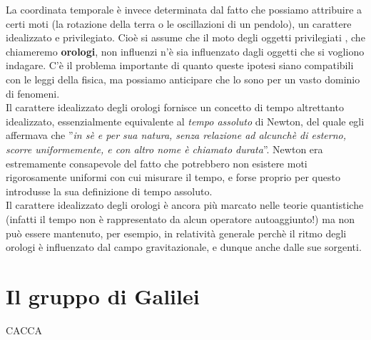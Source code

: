 \documentclass[a4paper,11pt]{book}
\theoremstyle{plain}
\theoremstyle{definition}
\begin{document}
La coordinata temporale è invece determinata dal fatto che possiamo attribuire a certi 
moti (la rotazione della terra o le oscillazioni di un pendolo), un carattere idealizzato e 
privilegiato. Cioè si assume che il moto degli oggetti privilegiati , che chiameremo \textbf{orologi}, 
non influenzi n'è sia influenzato dagli oggetti che si vogliono indagare. C'è il problema 
importante di quanto queste ipotesi siano compatibili con le leggi della fisica, ma possiamo 
anticipare che lo sono per un vasto dominio di fenomeni. \\
Il carattere idealizzato degli orologi fornisce un concetto di tempo altrettanto idealizzato, 
essenzialmente equivalente al \emph{tempo assoluto} di Newton, del quale egli affermava che 
''\emph{in sè e per sua natura, senza relazione ad alcunchè di esterno, scorre uniformemente, e 
con altro nome è chiamato durata}''. Newton era estremamente consapevole del fatto che 
potrebbero non esistere moti rigorosamente uniformi con cui misurare il tempo, e forse 
proprio per questo introdusse la sua definizione di tempo assoluto. \\
Il carattere idealizzato degli orologi è ancora più marcato nelle teorie quantistiche (infatti il tempo non è rappresentato da alcun operatore autoaggiunto!) ma non può essere mantenuto, per esempio, in relatività generale perchè il ritmo degli orologi è 
influenzato dal campo gravitazionale, e dunque anche dalle sue sorgenti. 

\section{Il gruppo di Galilei}
CACCA
\end{document}
